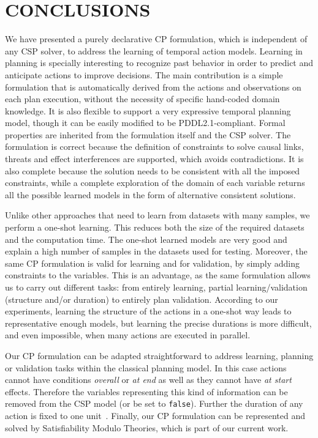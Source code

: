 \documentclass{ecai}
\begin{document}
\section{CONCLUSIONS}
\label{sec:conclusions}


We have presented a purely declarative CP formulation, which is independent of any CSP solver, to address the learning of temporal action models. Learning in planning is specially interesting to recognize past behavior in order to predict and anticipate actions to improve decisions.
The main contribution is a simple formulation that is automatically derived from the actions and observations on each plan execution, without the necessity of specific hand-coded domain knowledge. It is also flexible to support a very expressive temporal planning model, though it can be easily modified to be PDDL2.1-compliant.
Formal properties are inherited from the formulation itself and the CSP solver. The formulation is correct because the definition of constraints to solve causal links, threats and effect interferences are supported, which avoids contradictions. It is also complete because the solution needs to be consistent with all the imposed constraints, while a complete exploration of the domain of each variable returns all the possible learned models in the form of alternative consistent solutions.

Unlike other approaches that need to learn from datasets with many samples, we perform a one-shot learning. This reduces both the size of the required datasets and the computation time. The one-shot learned models are very good and explain a high number of samples in the datasets used for testing. Moreover, the same CP formulation is valid for learning and for validation, by simply adding constraints to the variables. This is an advantage, as the same formulation allows us to carry out different tasks: from entirely learning, partial learning/validation (structure and/or duration) to entirely plan validation.
According to our experiments, learning the structure of the actions in a one-shot way leads to representative enough models, but learning the precise durations is more difficult, and even impossible, when many actions are executed in parallel.

Our CP formulation can be adapted straightforward to address learning, planning or validation tasks within the classical planning model. In this case actions cannot have conditions {\em overall} or {\em at end} as well as they cannot have {\em at start} effects. Therefore the variables representing this kind of information can be removed from the CSP model (or be set to {\tt false}). Further the duration of any action is fixed to one unit~\cite{jimenez2015temporal}.  Finally, our CP formulation can be represented and solved by Satisfiability Modulo Theories, which is part of our current work. 






\end{document}
